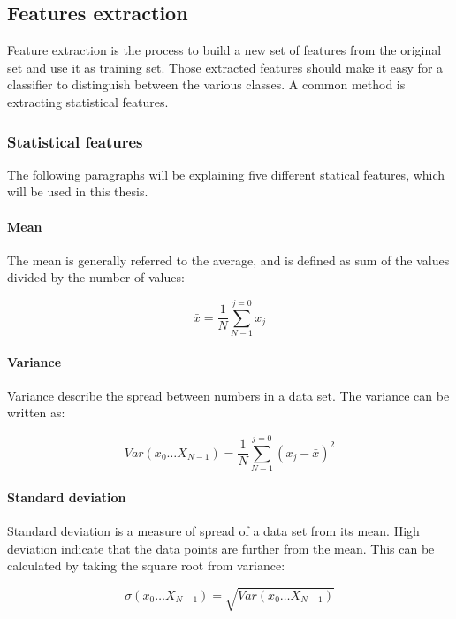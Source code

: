 \documentclass[USenglish]{ifimaster}  %
\begin{document}
	\subsection{Features extraction} \label{feature_extraction}
	Feature extraction is the process to build a new set of features from the original set and use it as training set. Those extracted features should make it easy for a classifier to distinguish between the various classes. A common method is extracting statistical features.
	
	\subsubsection{Statistical features} \label{sub:statical}
	The following paragraphs will be explaining five different statical features, which will be used in this thesis.
	
	\paragraph{Mean}
	The mean is generally referred to the average, and is defined as sum of the values divided by the number of values\cite{Press:2007:NRE:1403886}:
	
	\begin{equation}
	\bar{x} = \frac{1}{N}\sum_{N-1}^{j=0}x_{j}
	\label{eq:mean}
	\end{equation}
	
	
	\paragraph{Variance}
	Variance describe the spread between numbers in a data set. The variance can be written as\cite{Press:2007:NRE:1403886}:
	
	\begin{equation}
	Var(x_0\dotsc X_{N-1})  = \frac{1}{N}\sum_{N-1}^{j=0}(x_{j}-\bar{x})^2
	\label{eq:variance}
	\end{equation}
	
	\paragraph{Standard deviation}
	Standard deviation is a measure of spread of a data set from its mean. High deviation indicate that the data points are further from the mean. This can be calculated by taking the square root from variance\cite{Press:2007:NRE:1403886}:
	
	\begin{equation}
	\sigma(x_0\dotsc X_{N-1})  = \sqrt{Var(x_0\dotsc X_{N-1})}
	\label{eq:std}
	\end{equation}
	
\end{document}
